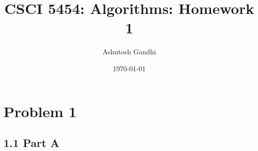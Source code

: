 \documentclass[12pt]{article}
\title{CSCI 5454: Algorithms: Homework 1}
\author{Ashutosh Gandhi}
\date{\today}
\begin{document}
\maketitle

\section*{Problem 1}


\subsection*{1.1 Part A} 

\vspace{10pt}


\end{document}
